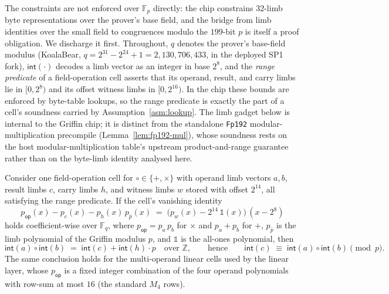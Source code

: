 The constraints are not enforced over $\mathbb{F}_p$ directly: the chip constrains $32$-limb byte representations over the prover's base field, and the bridge from limb identities over the small field to congruences modulo the $199$-bit $p$ is itself a proof obligation. We discharge it first. Throughout, $q$ denotes the prover's base-field modulus (KoalaBear, $q = 2^{31}-2^{24}+1 = 2{,}130{,}706{,}433$, in the deployed SP1 fork), $\mathsf{int}(\cdot)$ decodes a limb vector as an integer in base $2^{8}$, and the \emph{range predicate} of a field-operation cell asserts that its operand, result, and carry limbs lie in $[0,2^{8})$ and its offset witness limbs in $[0,2^{16})$. In the chip these bounds are enforced by byte-table lookups, so the range predicate is exactly the part of a cell's soundness carried by Assumption~\ref{asm:lookup}. The limb gadget below is internal to the Griffin chip; it is distinct from the standalone \texttt{Fp192} modular-multiplication precompile (Lemma~\ref{lem:fp192-mul}), whose soundness rests on the host modular-multiplication table's upstream product-and-range guarantee rather than on the byte-limb identity analysed here.

\begin{lemma}\label{lem:limb-gadget}
Consider one field-operation cell for $\circ\in\{+,\times\}$ with operand limb vectors $a,b$, result limbs $c$, carry limbs $h$, and witness limbs $w$ stored with offset $2^{14}$, all satisfying the range predicate. If the cell's vanishing identity
    \[
      p_{\mathsf{op}}(x) - p_{c}(x) - p_{h}(x)\,p_{\bar p}(x)
      \;=\;
      \bigl(p_{w}(x) - 2^{14}\,\mathbb{1}(x)\bigr)\,(x - 2^{8})
    \]
holds coefficient-wise over $\mathbb{F}_q$, where $p_{\mathsf{op}} = p_a\,p_b$ for $\times$ and $p_a + p_b$ for $+$, $p_{\bar p}$ is the limb polynomial of the Griffin modulus $p$, and $\mathbb{1}$ is the all-ones polynomial, then
    \[
      \mathsf{int}(a) \circ \mathsf{int}(b)
      \;=\;
      \mathsf{int}(c) + \mathsf{int}(h)\cdot p
      \quad\text{over } \mathbb{Z},
      \qquad\text{hence}\qquad
      \mathsf{int}(c) \;\equiv\; \mathsf{int}(a) \circ \mathsf{int}(b) \pmod{p}.
    \]
The same conclusion holds for the multi-operand linear cells used by the linear layer, whose $p_{\mathsf{op}}$ is a fixed integer combination of the four operand polynomials with row-sum at most $16$ (the standard $M_4$ rows).
\end{lemma}

